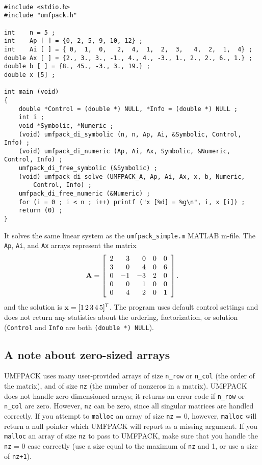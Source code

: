{\footnotesize
\begin{verbatim}

#include <stdio.h>
#include "umfpack.h"

int    n = 5 ;
int    Ap [ ] = {0, 2, 5, 9, 10, 12} ;
int    Ai [ ] = { 0,  1,  0,   2,  4,  1,  2,  3,   4,  2,  1,  4} ;
double Ax [ ] = {2., 3., 3., -1., 4., 4., -3., 1., 2., 2., 6., 1.} ;
double b [ ] = {8., 45., -3., 3., 19.} ;
double x [5] ;

int main (void)
{
    double *Control = (double *) NULL, *Info = (double *) NULL ;
    int i ;
    void *Symbolic, *Numeric ;
    (void) umfpack_di_symbolic (n, n, Ap, Ai, &Symbolic, Control, Info) ;
    (void) umfpack_di_numeric (Ap, Ai, Ax, Symbolic, &Numeric, Control, Info) ;
    umfpack_di_free_symbolic (&Symbolic) ;
    (void) umfpack_di_solve (UMFPACK_A, Ap, Ai, Ax, x, b, Numeric,
        Control, Info) ;
    umfpack_di_free_numeric (&Numeric) ;
    for (i = 0 ; i < n ; i++) printf ("x [%d] = %g\n", i, x [i]) ;
    return (0) ;
}

\end{verbatim}
}

It solves the same linear system as the {\tt umfpack\_simple.m} MATLAB m-file.
The {\tt Ap}, {\tt Ai}, and {\tt Ax} arrays represent the matrix
\[
{\bf{A}} = \left[
\begin{array}{rrrrr}
 2 &  3 &  0 &  0 &  0 \\
 3 &  0 &  4 &  0 &  6 \\
 0 & -1 & -3 &  2 &  0 \\
 0 &  0 &  1 &  0 &  0 \\
 0 &  4 &  2 &  0 &  1 \\
\end{array}
\right].
\]
and the solution is ${\bf{x}} = [1 \, 2 \, 3 \, 4 \, 5]^{\sf T}$.  The program uses
default control settings and does not return any statistics about the ordering,
factorization, or solution ({\tt Control} and {\tt Info} are both
{\tt (double *) NULL}).

\subsection{A note about zero-sized arrays}

UMFPACK uses many user-provided arrays of
size {\tt n\_row} or {\tt n\_col} (the order of the matrix), and of size
{\tt nz} (the number of nonzeros in a matrix).  UMFPACK does not handle
zero-dimensioned arrays; it returns an error code if {\tt n\_row} or {\tt n\_col}
are zero.  However, {\tt nz} can be zero, since all singular matrices are
handled correctly.  If you attempt to {\tt malloc} an array of size {\tt nz}
= 0, however, {\tt malloc} will return a null pointer which UMFPACK will report
as a missing argument.  If you {\tt malloc} an array of
size {\tt nz} to pass to UMFPACK, make sure that you handle the {\tt nz} = 0
case correctly (use a size equal to the maximum of {\tt nz} and 1, or use a
size of {\tt nz+1}).

